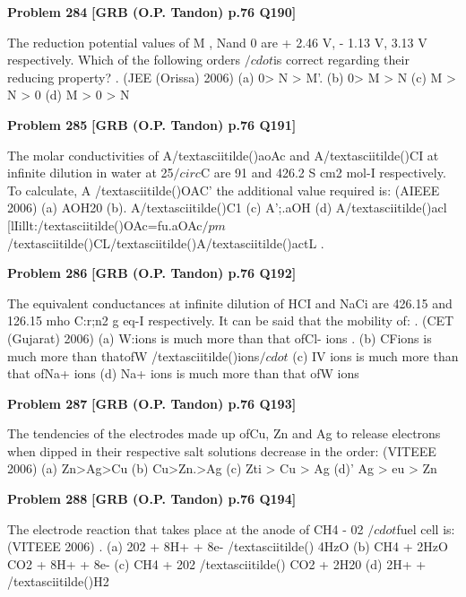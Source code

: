 \begin{problembox}
\textbf{Problem 284} \hfill \textbf{[GRB (O.P. Tandon) p.76 Q190]}
\label{q:ext-grb_all_questions-284}

The reduction potential values of M , Nand 0 are + 2.46 V, 
- 1.13 V, 
3.13 V respectively. Which of the following 
orders $/cdot$is correct regarding their reducing property? 
. 
(JEE (Orissa) 2006) 
(a) 0> N > M'. 
(b) 0> M > N 
(c) M > N > 0 
(d) M > 0 > N
\end{problembox}

\begin{problembox}
\textbf{Problem 285} \hfill \textbf{[GRB (O.P. Tandon) p.76 Q191]}
\label{q:ext-grb_all_questions-285}

The molar conductivities of A/textasciitilde()aoAc and A/textasciitilde()CI at infinite 
dilution in water at 25$/circ$C are 91 and 426.2 S cm2 mol-I 
respectively. To calculate, A /textasciitilde()OAC' the additional value 
required is: 
(AIEEE 2006) 
(a) AOH20 
(b). A/textasciitilde()C1 
(c) A';.aOH 
(d) A/textasciitilde()acl 
[lIillt:/textasciitilde()OAc=fu.aOAc$/pm$/textasciitilde()CL/textasciitilde()A/textasciitilde()actL .
\end{problembox}

\begin{problembox}
\textbf{Problem 286} \hfill \textbf{[GRB (O.P. Tandon) p.76 Q192]}
\label{q:ext-grb_all_questions-286}

The equivalent conductances at infinite dilution of HCI and 
NaCi are 426.15 and 126.15 mho C:r;n2 g eq-I respectively. It 
can be said that the mobility of: 
. (CET (Gujarat) 2006) 
(a) W:ions is much more than that ofCl- ions 
. 
(b) CFions is much more than thatofW /textasciitilde()ions$/cdot$ 
(c) IV ions is much more than that ofNa+ ions 
(d) Na+ ions is much more than that ofW ions
\end{problembox}

\begin{problembox}
\textbf{Problem 287} \hfill \textbf{[GRB (O.P. Tandon) p.76 Q193]}
\label{q:ext-grb_all_questions-287}

The tendencies of the electrodes made up ofCu, Zn and Ag to 
release electrons when dipped in their respective salt solutions 
decrease in the order: 
(VITEEE 2006) 
(a) Zn>Ag>Cu 
(b) Cu>Zn.>Ag 
(c) Zti > Cu > Ag 
(d)' Ag > eu > Zn
\end{problembox}

\begin{problembox}
\textbf{Problem 288} \hfill \textbf{[GRB (O.P. Tandon) p.76 Q194]}
\label{q:ext-grb_all_questions-288}

The electrode reaction that takes place at the anode of 
CH4 -
02 $/cdot$fuel cell is: 
(VITEEE 2006) 
. (a) 202 + 8H+ + 8e- /textasciitilde() 
4HzO 
(b) CH4 + 2HzO 
CO2 + 8H+ + 8e-
(c) CH4 + 202 /textasciitilde() 
CO2 + 2H20 
(d) 2H+ + 
/textasciitilde()H2
\end{problembox}


